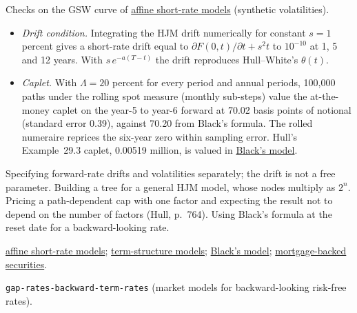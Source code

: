 \begin{qfmodel}
 Checks on the GSW curve of \hyperref[mod:affine-short-rate-models]{affine short-rate models} (synthetic volatilities).
\begin{itemize}
\item \emph{Drift condition.} Integrating the HJM drift numerically for constant $s=1$ percent gives a short-rate drift equal to $\partial F(0,t)/\partial t+s^2t$ to $10^{-10}$ at 1, 5 and 12 years. With $s\,e^{-a(T-t)}$ the drift reproduces Hull--White's $\theta(t)$.
\item \emph{Caplet.} With $\Lambda=20$ percent for every period and annual periods, 100{,}000 paths under the rolling spot measure (monthly sub-steps) value the at-the-money caplet on the year-5 to year-6 forward at 70.02 basis points of notional (standard error 0.39), against 70.20 from Black's formula. The rolled numeraire reprices the six-year zero within sampling error. Hull's Example~29.3 caplet, 0.00519 million, is valued in \hyperref[meth:black-model-rates-currencies]{Black's model}.
\end{itemize}

 Specifying forward-rate drifts and volatilities separately; the drift is not a free parameter. Building a tree for a general HJM model, whose nodes multiply as $2^n$. Pricing a path-dependent cap with one factor and expecting the result not to depend on the number of factors (Hull, p.~764). Using Black's formula at the reset date for a backward-looking rate.

 \hyperref[mod:affine-short-rate-models]{affine short-rate models}; \hyperref[mod:term-structure-models-simulation]{term-structure models}; \hyperref[meth:black-model-rates-currencies]{Black's model}; \hyperref[meth:mortgage-securities-prepayment]{mortgage-backed securities}.

 \nolinkurl{gap-rates-backward-term-rates} (market models for backward-looking risk-free rates).

\end{qfmodel}
